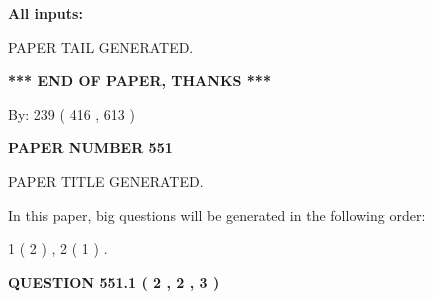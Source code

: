 \documentclass[12pt]{article}
\begin{document}
   
   
   
\noindent{}
   
   
   
   
\noindent\vspace{0.1in}\hspace{-0.08in} {\textbf{\Large{All inputs: }}}
   
   
   
   
   
   
 \vspace{0.2in}
 
   
   
\vspace{2.0in} PAPER TAIL GENERATED.
   
   
   
   
\vspace{1.0in} 
{\textbf{\large{ *** END OF PAPER, THANKS *** }}} 
   
   
\hspace{1.0in} By: 
 239 ( 416 ,  613 )
   
   
   
   
\newpage 
\setcounter{page}{ 
   551001 } 
   
   
   
   
 {\textbf{ \Large{ PAPER NUMBER  551  }}}
   
   
\vspace{0.2in}
   
   
   
   
   
   
   
   
 \vspace{0.2in}
 
 
 
 
   
   
 PAPER TITLE GENERATED.
   
   
   
\vspace{0.2in}
   
In this paper, big questions will be generated in the following order: 
   
   
   1 ( 2 )
 ,
   2 ( 1 )
 .
  
\vspace{0.2in}
  
{\textbf{\Large{QUESTION
551.1 
 ( 2 , 2 , 3 )
}}}
  
\end{document}
